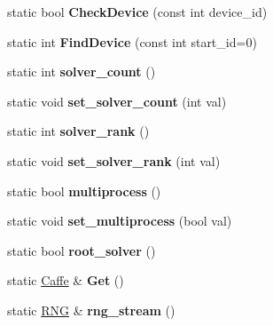 \begin{DoxyCompactItemize}
static bool {\bfseries Check\+Device} (const int device\+\_\+id)
\item 
\mbox{\label{classcaffe_1_1_caffe_a7ef45036fc831ca416fd1695fc749ea3}} 
static int {\bfseries Find\+Device} (const int start\+\_\+id=0)
\item 
\mbox{\label{classcaffe_1_1_caffe_a69e125ae1d6bfa3618fa4d0418d97468}} 
static int {\bfseries solver\+\_\+count} ()
\item 
\mbox{\label{classcaffe_1_1_caffe_ae66753e0dd783b50bbc61c40c89a43f3}} 
static void {\bfseries set\+\_\+solver\+\_\+count} (int val)
\item 
\mbox{\label{classcaffe_1_1_caffe_abdd6522457e7ac94463d26408620f4c9}} 
static int {\bfseries solver\+\_\+rank} ()
\item 
\mbox{\label{classcaffe_1_1_caffe_a2ec5a171e837fc106e7d1987e3c9a45d}} 
static void {\bfseries set\+\_\+solver\+\_\+rank} (int val)
\item 
\mbox{\label{classcaffe_1_1_caffe_a181e979bf7f7f2fe4a6c5fbbc4d703ac}} 
static bool {\bfseries multiprocess} ()
\item 
\mbox{\label{classcaffe_1_1_caffe_aea8888baaabfc41014eba175a2538b7b}} 
static void {\bfseries set\+\_\+multiprocess} (bool val)
\item 
\mbox{\label{classcaffe_1_1_caffe_a87775a1589a6e1b6e53d9bdbb013b8d8}} 
static bool {\bfseries root\+\_\+solver} ()
\item 
\mbox{\label{classcaffe_1_1_caffe_a6a0a8e4ff537a038707f50f28f6ca65d}} 
static \mbox{\hyperlink{classcaffe_1_1_caffe}{Caffe}} \& {\bfseries Get} ()
\item 
\mbox{\label{classcaffe_1_1_caffe_aff31f4285d99f4254e2af4e40678bf5e}} 
static \mbox{\hyperlink{classcaffe_1_1_caffe_1_1_r_n_g}{R\+NG}} \& {\bfseries rng\+\_\+stream} ()
\item 
\mbox{\label{classcaffe_1_1_caffe_afbba8bb2af70b628eca89269b81c915f}} 

\end{DoxyCompactItemize}
